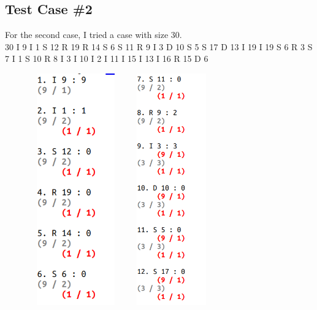 \documentclass[12pt]{article}
\begin{document}
\subsection{Test Case \#2}
For the second case, I tried a case with size 30.\\
30\quad
I 9\quad
I 1\quad
S 12\quad
R 19\quad
R 14\quad
S 6\quad
S 11\quad
R 9\quad
I 3\quad
D 10\quad
S 5\quad
S 17\quad
D 13\quad
I 19\quad
I 19\quad
S 6\quad
R 3\quad
S 7\quad
I 1\quad
S 10\quad
R 8\quad
I 3\quad
I 10\quad
I 2\quad
I 11\quad
I 15\quad
I 13\quad
I 16\quad
R 15\quad
D 6\\
\pagebreak
\begin{figure}[h!]
	\begin{center}
		\includegraphics[width=4cm, height=10cm]{pic/test2-1.png}
		\includegraphics[width=4cm, height=10cm]{pic/test2-2.png}

\end{center}
\end{figure}
\end{document}
